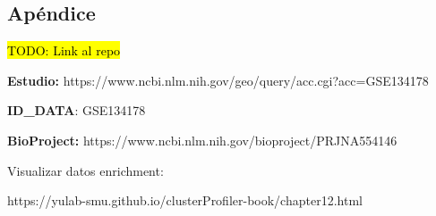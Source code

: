 \documentclass[
]{article}
\begin{document}
\hypertarget{header-n1366}{%
\subsection{Apéndice}\label{header-n1366}}

\hl{TODO: Link al repo}

\textbf{Estudio:}
https://www.ncbi.nlm.nih.gov/geo/query/acc.cgi?acc=GSE134178

\textbf{ID\_DATA}: GSE134178

\textbf{BioProject:} https://www.ncbi.nlm.nih.gov/bioproject/PRJNA554146

Visualizar datos enrichment:

https://yulab-smu.github.io/clusterProfiler-book/chapter12.html
\end{document}
